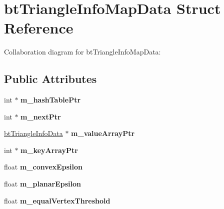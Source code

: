 \hypertarget{structbt_triangle_info_map_data}{\section{bt\+Triangle\+Info\+Map\+Data Struct Reference}
\label{structbt_triangle_info_map_data}
}


Collaboration diagram for bt\+Triangle\+Info\+Map\+Data\+:
\subsection*{Public Attributes}
\begin{DoxyCompactItemize}
\item 
\hypertarget{structbt_triangle_info_map_data_a9ff21cb0edece7febe07f35264d6c3e2}{int $\ast$ {\bfseries m\+\_\+hash\+Table\+Ptr}}\label{structbt_triangle_info_map_data_a9ff21cb0edece7febe07f35264d6c3e2}

\item 
\hypertarget{structbt_triangle_info_map_data_ae12abb5b22c8f03feef04b690217f5f7}{int $\ast$ {\bfseries m\+\_\+next\+Ptr}}\label{structbt_triangle_info_map_data_ae12abb5b22c8f03feef04b690217f5f7}

\item 
\hypertarget{structbt_triangle_info_map_data_acee5a3f6515b47d80aa867cc7c227d98}{\hyperlink{structbt_triangle_info_data}{bt\+Triangle\+Info\+Data} $\ast$ {\bfseries m\+\_\+value\+Array\+Ptr}}\label{structbt_triangle_info_map_data_acee5a3f6515b47d80aa867cc7c227d98}

\item 
\hypertarget{structbt_triangle_info_map_data_aa2486dfbbe8c43d8d38cd1e7c2bc53a0}{int $\ast$ {\bfseries m\+\_\+key\+Array\+Ptr}}\label{structbt_triangle_info_map_data_aa2486dfbbe8c43d8d38cd1e7c2bc53a0}

\item 
\hypertarget{structbt_triangle_info_map_data_a57268fe5d54a43c015282ef8dd3a9fcf}{float {\bfseries m\+\_\+convex\+Epsilon}}\label{structbt_triangle_info_map_data_a57268fe5d54a43c015282ef8dd3a9fcf}

\item 
\hypertarget{structbt_triangle_info_map_data_aa79b47e391203c1e1fc9c6d4a2578000}{float {\bfseries m\+\_\+planar\+Epsilon}}\label{structbt_triangle_info_map_data_aa79b47e391203c1e1fc9c6d4a2578000}

\item 
\hypertarget{structbt_triangle_info_map_data_a8c6eb6d31ed6cf56bbd7aad6158229a0}{float {\bfseries m\+\_\+equal\+Vertex\+Threshold}}\label{structbt_triangle_info_map_data_a8c6eb6d31ed6cf56bbd7aad6158229a0}


\end{DoxyCompactItemize}
